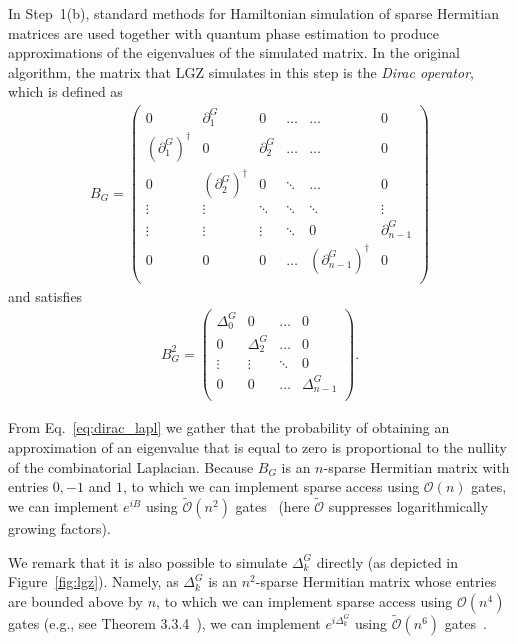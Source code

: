 \documentclass[a4paper, onecolumn, accepted=2022-08-28]{quantumarticle}
\newcommand{\bigO}[1]{\mathcal{O}\left( #1 \right)}
\newcommand{\bOt}[1]{\widetilde{\mathcal O}\left(#1\right)}
\begin{document}
In Step~1(b), standard methods for Hamiltonian simulation of sparse Hermitian matrices are used together with quantum phase estimation to produce approximations of the eigenvalues of the simulated matrix.
In the original algorithm, the matrix that LGZ simulates in this step is the \emph{Dirac operator}, which is defined as
\begin{align*}
  B_G = \begin{pmatrix}
    0 & \partial^G_1 & 0 & \dots & \dots & 0 \\
    \left(\partial^G_1\right)^\dagger & 0 & \partial^G_2 & \dots & \dots & 0\\
    0 & \left(\partial^G_2\right)^\dagger & 0 & \ddots & \dots & 0 \\
    \vdots & \vdots & \ddots & \ddots & \ddots & \vdots\\
    \vdots & \vdots & \vdots & \ddots&  0 & \partial^G_{n-1} \\
    0 & 0 & 0 & \dots & \left(\partial^G_{n-1}\right)^\dagger & 0 \\
  \end{pmatrix}
\end{align*}
and satisfies
\begin{align}
  B_G^2 =
  \begin{pmatrix}
    \Delta^G_0 & 0        & \dots & 0 \\
    0        & \Delta^G_2 & \dots & 0\\
    \vdots   & \vdots   & \ddots & 0 \\
    0        & 0        & \dots & \Delta^G_{n-1} \\
  \end{pmatrix}.
  \label{eq:dirac_lapl}
\end{align}

From Eq.~\eqref{eq:dirac_lapl} we gather that the probability of obtaining an approximation of an eigenvalue that is equal to zero is proportional to the nullity of the combinatorial Laplacian.
Because $B_G$ is an $n$-sparse Hermitian matrix with entries $0, -1$ and $1$, to which we can implement sparse access using $\bigO{n}$ gates, we can implement $e^{iB}$ using $\bOt{n^2}$ gates~\cite{low:hs} (here $\widetilde{\mathcal{O}}$ suppresses logarithmically growing factors).


We remark that it is also possible to simulate $\Delta_k^G$ directly (as depicted in Figure~\ref{fig:lgz}).
Namely, as $\Delta_k^G$ is an $n^2$-sparse Hermitian matrix whose entries are bounded above by $n$, to which we can implement sparse access using $\bigO{n^4}$ gates (e.g., see Theorem 3.3.4~\cite{goldberg:comb_lapl}), we can implement $e^{i \Delta_k^G}$ using $\bOt{n^6}$ gates~\cite{low:hs}.
\end{document}
